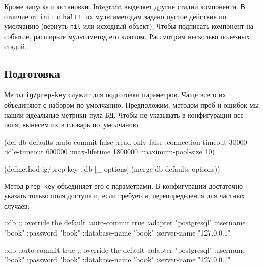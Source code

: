 
Кроме запуска и остановки, Integrant выделяет другие стадии компонента. В
отличие от \verb|init| и \verb|halt!|, их мультиметодам задано пустое действие
по умолчанию (вернуть \verb|nil| или исходный объект). Чтобы подписать компонент
на событие, расширьте мультиметод его ключом. Рассмотрим несколько полезных
стадий.

\subsection{Подготовка}

Метод \verb|ig/prep-key| служит для подготовки параметров. Чаще всего их
объединяют с набором по умолчанию. Предположим, методом проб и ошибок мы нашли
идеальные метрики пула БД. Чтобы не указывать в конфигурации все поля, вынесем
их в словарь по~умолчанию.

\ifafive\vspace{10mm}\pagebreak[4]\fi

\begin{english}
  \begin{clojure}
(def db-defaults
  {:auto-commit        false
   :read-only          false
   :connection-timeout 30000
   :idle-timeout       600000
   :max-lifetime       1800000
   :maximum-pool-size  10})

(defmethod ig/prep-key ::db
  [_ options]
  (merge db-defaults options))
  \end{clojure}
\end{english}

Метод \verb|prep-key| объединяет его с параметрами. В конфигурации достаточно
указать только поля доступа и, если требуется, переопределения для частных
случаев:

\ifnarrow

\begin{english}
  \begin{clojure}
{::db {;; override the default
       :auto-commit   true
       :adapter       "postgresql"
       :username      "book"
       :password      "book"
       :database-name "book"
       :server-name   "127.0.0.1"}}
  \end{clojure}
\end{english}

\else

\begin{english}
  \begin{clojure}
{::db {:auto-commit   true ;; override the default
       :adapter       "postgresql"
       :username      "book"
       :password      "book"
       :database-name "book"
       :server-name   "127.0.0.1"}}
  \end{clojure}
\end{english}


